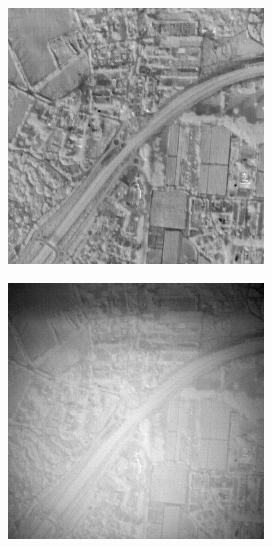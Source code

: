 \begin{figure}
  \begin{subfigure}[b]{0.15\textwidth}
      \centering
      \includegraphics[width=\textwidth]{../figs/outputs/pan/591.png}
      \label{fig:pan_in}
  \end{subfigure}
  \hfill
  \begin{subfigure}[b]{0.15\textwidth}
      \centering
      \includegraphics[width=\textwidth]{../figs/outputs/physical/591.png}

\end{subfigure}
\end{figure}

